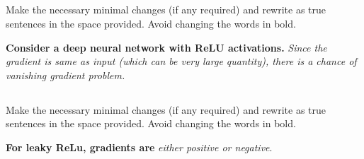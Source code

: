 \begin{frame}
\section{}
Make the necessary minimal changes  (if any required) and rewrite as true sentences in the space provided. Avoid changing the words in bold.

{\bf Consider a deep neural network with ReLU activations.} {\em Since the gradient is same as input (which can be very large quantity), there is a chance of vanishing gradient problem.}
\end{frame}

\begin{frame}
\section{}
Make the necessary minimal changes  (if any required) and rewrite as true sentences in the space provided. Avoid changing the words in bold.

{\bf For leaky ReLu, gradients are} {\em either positive or negative}.
\end{frame}
